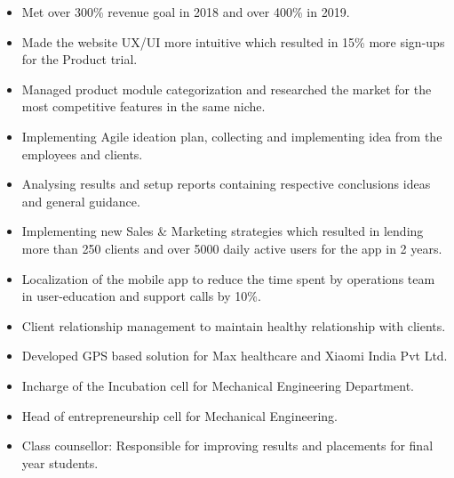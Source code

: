 \documentclass[10pt,a4paper]{jsarticle}
\begin{document}
\begin{itemize}
\item Met over 300\% revenue goal in 2018 and over 400\% in 2019. 
\item Made the website UX/UI more intuitive which resulted in 15\% more sign-ups for the Product trial.  
\item Managed product module categorization and researched the market for the most competitive features in the same niche. 
\item Implementing Agile ideation plan, collecting and implementing idea from the employees and clients.
\item Analysing results and setup reports containing respective conclusions ideas and general guidance.
\item Implementing new Sales \& Marketing strategies which resulted in lending more than 250 clients and over 5000 daily active users for the app in 2 years.
\item Localization of the mobile app to reduce the time spent by operations team in user-education and support calls by 10\%.
\item Client relationship management to maintain healthy relationship with clients.
\item Developed GPS based solution for Max healthcare and Xiaomi India Pvt Ltd.
\end{itemize}
\divider
{}
\begin{itemize}
\item Incharge of the Incubation cell for Mechanical Engineering Department. 
\item Head of entrepreneurship cell for Mechanical Engineering.  
\item Class counsellor: Responsible for improving results and placements for final year students. 
\end{itemize}
\divider



\divider



\medskip
\end{document}
